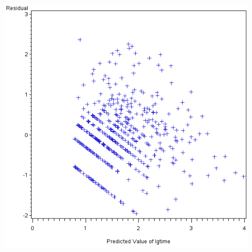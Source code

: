 \documentclass{article}
\begin{document}
\includegraphics[]{regressx2-1-SAS-fig.png}
\end{document}
